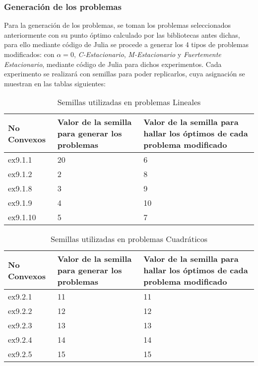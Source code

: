 \subsubsection{Generación de los problemas}
Para la generación de los problemas, se toman los problemas seleccionados anteriormente con su punto óptimo calculado por las bibliotecas antes dichas, para ello mediante código de Julia se procede a generar los 4 tipos de problemas modificados: con \textit{$\alpha =0 $}, \textit{C-Estacionario}, \textit{M-Estacionario} y \textit{Fuertemente Estacionario}, mediante 
código de Julia para dichos experimentos. Cada experimento se realizará con semillas para poder replicarlos, cuya asignación se muestran en las tablas siguientes:



\begin{table}[h!]
\centering
\caption{Semillas utilizadas en problemas Lineales}
\begin{tabular}{ | m{5cm} | m{5cm} | m{5cm} | }
  
  \hline
  \textbf{No Convexos} & \textbf{Valor de la semilla para generar los problemas}  & \textbf{Valor de la semilla para hallar los óptimos de cada problema modificado} \\
  \hline
 ex9.1.1 & 20 & 6 \\
  \hline
 ex9.1.2 & 2 & 8\\
  \hline
   ex9.1.8 & 3& 9 \\
  \hline
  ex9.1.9 & 4 & 10\\
  \hline
 ex9.1.10 & 5 & 7 \\
  \hline
\end{tabular}
\end{table}


\begin{table}[h!]
    \centering
    \caption{Semillas utilizadas en problemas Cuadráticos}
    \begin{tabular}{ | m{5cm} | m{5cm} | m{5cm} | }
      
      \hline
      \textbf{No Convexos} & \textbf{Valor de la semilla para generar los problemas}  & \textbf{Valor de la semilla para hallar los óptimos de cada problema modificado} \\
      \hline
      ex9.2.1 & 11 &11 \\
      \hline
      ex9.2.2 & 12 &12 \\
      \hline
      ex9.2.3 & 13 &13\\
      \hline
      ex9.2.4 & 14 &14\\
      \hline
      ex9.2.5 & 15 &15\\
      \hline
    \end{tabular}
    \end{table}

